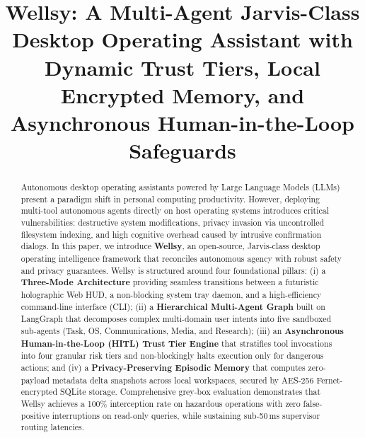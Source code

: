 \documentclass[conference]{IEEEtran}
\begin{document}
\title{Wellsy: A Multi-Agent Jarvis-Class Desktop Operating Assistant with Dynamic Trust Tiers, Local Encrypted Memory, and Asynchronous Human-in-the-Loop Safeguards}

\author{
\and
{}
}

\maketitle

\begin{abstract}
Autonomous desktop operating assistants powered by Large Language Models (LLMs) present a paradigm shift in personal computing productivity. However, deploying multi-tool autonomous agents directly on host operating systems introduces critical vulnerabilities: destructive system modifications, privacy invasion via uncontrolled filesystem indexing, and high cognitive overhead caused by intrusive confirmation dialogs. In this paper, we introduce \textbf{Wellsy}, an open-source, Jarvis-class desktop operating intelligence framework that reconciles autonomous agency with robust safety and privacy guarantees. Wellsy is structured around four foundational pillars: (i) a \textbf{Three-Mode Architecture} providing seamless transitions between a futuristic holographic Web HUD, a non-blocking system tray daemon, and a high-efficiency command-line interface (CLI); (ii) a \textbf{Hierarchical Multi-Agent Graph} built on LangGraph that decomposes complex multi-domain user intents into five sandboxed sub-agents (Task, OS, Communications, Media, and Research); (iii) an \textbf{Asynchronous Human-in-the-Loop (HITL) Trust Tier Engine} that stratifies tool invocations into four granular risk tiers and non-blockingly halts execution only for dangerous actions; and (iv) a \textbf{Privacy-Preserving Episodic Memory} that computes zero-payload metadata delta snapshots across local workspaces, secured by AES-256 Fernet-encrypted SQLite storage. Comprehensive grey-box evaluation demonstrates that Wellsy achieves a 100\% interception rate on hazardous operations with zero false-positive interruptions on read-only queries, while sustaining sub-50\,ms supervisor routing latencies.
\end{abstract}
\end{document}
